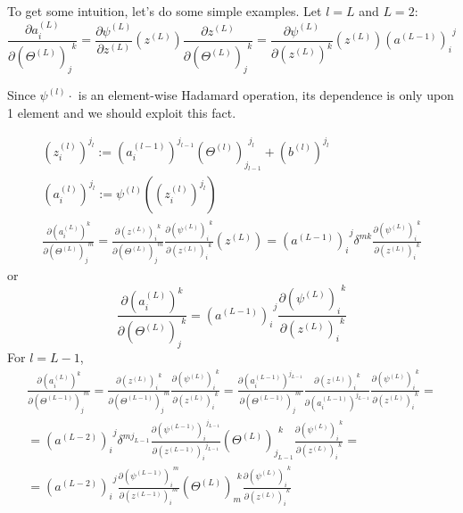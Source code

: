 \documentclass[10pt]{amsart}
\begin{document}
\begin{multicols*}{2}
To get some intuition, let's do some simple examples.  Let $l=L$ and $L=2$:
\[
\frac{\partial a_i^{(L)} }{ \partial (\Theta^{(L)})_j^{\  \  k} } = \frac{ \partial \psi^{(L)} }{ \partial z^{(L)} }(z^{(L)} )  \frac{ \partial z^{(L)} }{ \partial (\Theta^{(L)})_j^{\  \  k} }= \frac{ \partial \psi^{(L)} }{ \partial ( z^{(L)})^k } (z^{(L)}  ) (a^{(L-1)})_i^{\  \  j} 
\]

Since $\psi^{(l)} \cdot$ is an element-wise Hadamard operation, its dependence is only upon 1 element and we should exploit this fact.  

\[
\begin{gathered}
(z_i^{(l)})^{j_l} := (a_i^{(l-1)})^{j_{l-1}} (\Theta^{(l)})_{j_{l-1}}^{\  \  j_l} + (b^{(l)})^{j_l} \\ 
(a_i^{(l)})^{j_l} := \psi^{(l)}( (z_i^{(l)} )^{j_l} )  \\
\frac{\partial (a_i^{(L)})^k }{ \partial (\Theta^{(L)})_j^{\  \  m} } = \frac{ \partial (z^{(L)})_i^{\  \  k} }{ \partial (\Theta^{(L)})_j^{\  \  m} }  \frac{ \partial (\psi^{(L)})_i^{\  \  k } }{ \partial (z^{(L)})_i^{\  \  k} }(z^{(L)} )   = (a^{(L-1)})_i^{\  \  j} \delta^{mk}  \frac{ \partial (\psi^{(L)})_i^{\  \  k } }{ \partial (z^{(L)})_i^{\  \  k} }
\end{gathered}
\]
or 
\[
\frac{\partial (a_i^{(L)})^k }{ \partial (\Theta^{(L)})_j^{\  \  k} } =  (a^{(L-1)})_i^{\  \  j}   \frac{ \partial (\psi^{(L)})_i^{\  \  k } }{ \partial (z^{(L)})_i^{\  \  k} }
\]
For $l=L-1$, 
\[
\begin{gathered}
\frac{\partial (a_i^{(L)})^k }{ \partial (\Theta^{(L-1)})_j^{\  \  m} } = \frac{ \partial (z^{(L)})_i^{\  \  k} }{ \partial (\Theta^{(L-1)})_j^{\  \  m} }  \frac{ \partial (\psi^{(L)})_i^{\  \  k } }{ \partial (z^{(L)})_i^{\  \  k} }   =  \frac{\partial (a_i^{(L-1)})^{j_{L-1} }}{ \partial (\Theta^{(L-1)})_j^{\  \  m} } \frac{ \partial (z^{(L)})_i^{\  \  k} }{ \partial ( a_i^{(L-1)})^{    j_{L-1}} }     \frac{ \partial (\psi^{(L)})_i^{\  \  k } }{ \partial (z^{(L)})_i^{\  \  k} } = \\
= (a^{(L-2)})_i^{\  \  j} \delta^{m j_{L-1}}  \frac{ \partial (\psi^{(L-1)})_i^{\  \  j_{L-1} } }{ \partial (z^{(L-1)})_i^{\  \  j_{L-1}} }  (\Theta^{(L)})_{ j_{L-1}}^{\  \  k}    \frac{ \partial (\psi^{(L)})_i^{\  \  k } }{ \partial (z^{(L)})_i^{\  \  k} } = \\ 
= (a^{(L-2)})_i^{\  \  j}    \frac{ \partial (\psi^{(L-1)})_i^{\  \  m } }{ \partial (z^{(L-1)})_i^{\  \   m } }  (\Theta^{(L)})_{ m }^{\  \  k}    \frac{ \partial (\psi^{(L)})_i^{\  \  k } }{ \partial (z^{(L)})_i^{\  \  k} }
\end{gathered}
\]


\end{multicols*}
\end{document}
